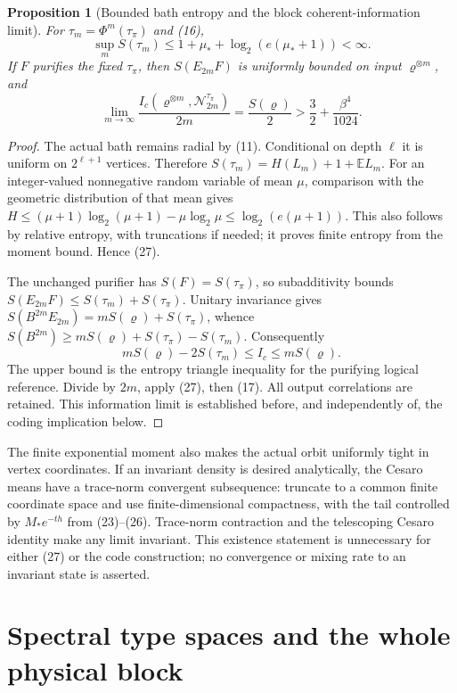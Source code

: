 \documentclass[11pt]{article}
\newtheorem{proposition}[theorem]{Proposition}
\newcommand{\E}{\mathbb E}
\begin{document}
\begin{proposition}[Bounded bath entropy and the block coherent-information limit]
\label{prop:information}
For $\tau_m=\Phi^m(\tau_\pi)$ and (16),
\[
 \sup_m S(\tau_m)\le1+\mu_*+\log_2(e(\mu_*+1))<\infty.
 \tag{27}
\]
If $F$ purifies the fixed $\tau_\pi$, then $S(E_{2m}F)$ is uniformly bounded
on input $\varrho^{\otimes m}$, and
\[
 \lim_{m\to\infty}\frac{I_c(\varrho^{\otimes m},\mathcal N_{2m}^{\tau_\pi})}{2m}
 =\frac{S(\varrho)}2>\frac32+\frac{\beta^4}{1024}.
 \tag{28}
\]
\end{proposition}
\begin{proof}
The actual bath remains radial by (11). Conditional on depth $\ell$ it is
uniform on $2^{\ell+1}$ vertices. Therefore
$S(\tau_m)=H(L_m)+1+\E L_m$. For an integer-valued nonnegative random variable
of mean $\mu$, comparison with the geometric distribution of that mean gives
$H\le(\mu+1)\log_2(\mu+1)-\mu\log_2\mu\le\log_2(e(\mu+1))$.
This also follows by relative entropy, with truncations if needed; it proves
finite entropy from the moment bound. Hence (27).

The unchanged purifier has $S(F)=S(\tau_\pi)$, so subadditivity bounds
$S(E_{2m}F)\le S(\tau_m)+S(\tau_\pi)$. Unitary invariance gives
$S(B^{2m}E_{2m})=mS(\varrho)+S(\tau_\pi)$, whence
$S(B^{2m})\ge mS(\varrho)+S(\tau_\pi)-S(\tau_m)$.
Consequently
\[
 mS(\varrho)-2S(\tau_m)\le I_c\le mS(\varrho).
\]
The upper bound is the entropy triangle inequality for the purifying logical
reference. Divide by $2m$, apply (27), then (17).
All output correlations are retained. This information limit is established
before, and independently of, the coding implication below.
\end{proof}

The finite exponential moment also makes the actual orbit uniformly tight
in vertex coordinates. If an invariant density is desired analytically, the
Cesaro means have a trace-norm convergent subsequence: truncate to a common
finite coordinate space and use finite-dimensional compactness, with the
tail controlled by $M_*e^{-th}$ from (23)--(26). Trace-norm contraction and the telescoping Cesaro
identity make any limit invariant. This existence statement is unnecessary
for either (27) or the code construction; no convergence or mixing rate to
an invariant state is asserted.

\section{Spectral type spaces and the whole physical block}
\end{document}
